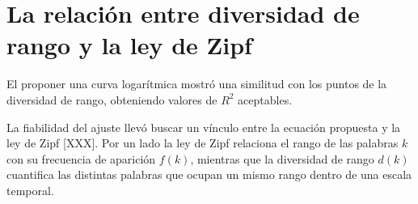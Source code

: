 

\section{La relación entre diversidad de rango y la ley de Zipf}

El proponer una curva logarítmica mostró una similitud con los puntos de la diversidad de rango, obteniendo valores de $R^{2}$ aceptables. 
 
La fiabilidad del ajuste llevó buscar un vínculo entre la ecuación propuesta y  la ley de Zipf [XXX]. Por un lado la ley de Zipf relaciona el rango de las palabras $k$ con su frecuencia de aparición $f(k)$,  mientras que la diversidad de rango $d(k) $cuantifica las distintas palabras que ocupan un mismo rango dentro de una escala temporal.  

